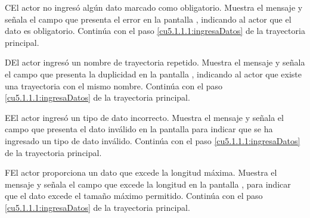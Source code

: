  \begin{UCtrayectoriaA}{C}{El actor no ingresó algún dato marcado como obligatorio.}
    \UCpaso[\UCsist] Muestra el mensaje  y señala el campo que presenta el error en la pantalla 
	    , indicando al actor que el dato es obligatorio.
    \UCpaso[] Continúa con el paso \ref{cu5.1.1.1:ingresaDatos} de la trayectoria principal.
 \end{UCtrayectoriaA}
 \begin{UCtrayectoriaA}{D}{El actor ingresó un nombre de trayectoria repetido.}
    \UCpaso[\UCsist] Muestra el mensaje  y señala el campo que presenta la duplicidad en la pantalla 
	    , indicando al actor que existe una trayectoria con el mismo nombre.
    \UCpaso[] Continúa con el paso \ref{cu5.1.1.1:ingresaDatos} de la trayectoria principal.
 \end{UCtrayectoriaA}
 \begin{UCtrayectoriaA}{E}{El actor ingresó un tipo de dato incorrecto.}
    \UCpaso[\UCsist] Muestra el mensaje  y señala el campo que presenta el dato inválido en la 
    pantalla  para indicar que se ha ingresado un tipo de dato inválido.
    \UCpaso[] Continúa con el paso \ref{cu5.1.1.1:ingresaDatos} de la trayectoria principal.
 \end{UCtrayectoriaA}
 \begin{UCtrayectoriaA}{F}{El actor proporciona un dato que excede la longitud máxima.}
    \UCpaso[\UCsist] Muestra el mensaje  y señala el campo que excede la 
    longitud en la pantalla , para indicar que el dato excede el tamaño máximo permitido.
    \UCpaso[] Continúa con el paso \ref{cu5.1.1.1:ingresaDatos} de la trayectoria principal.
 \end{UCtrayectoriaA}
 
